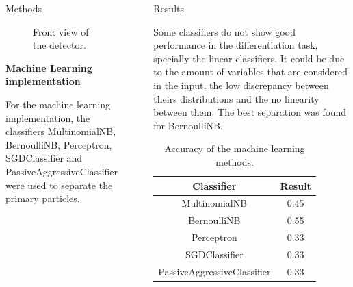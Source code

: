 \documentclass{beamer}
\newlength{\sepwidthB}
\newlength{\colwidthB}
\newcommand{\separatorcolumnB}{\begin{column}{\sepwidthB}\end{column}}
\begin{document}
\begin{frame}{}
\begin{columns}
\begin{column}[T]{\colwidthB}
\begin{block}{Methods}
\begin{figure}[htb]
            \caption{Front view of the detector.}\label{fig:cropped-geometry}

          \end{figure}

          \textbf{Machine Learning implementation}

          For the machine learning implementation, the classifiers
          MultinomialNB, BernoulliNB, Perceptron, SGDClassifier and
          PassiveAggressiveClassifier were used to separate the primary
          particles.

        \end{block}

      \end{column}
      \separatorcolumnB

      \begin{column}[T]{\colwidthB}

        \begin{block}{Results}

          Some classifiers do not show good performance in the differentiation
          task, specially the linear classifiers. It could be due to the amount
          of variables that are considered in the input, the low discrepancy
          between theirs distributions and the no linearity between them. The
          best separation was found for BernoulliNB.

          \begin{table}[hbt]
            \centering
            \begin{tabular}{c c}
              \textbf{Classifier} & \textbf{Result}\\
              \toprule
              MultinomialNB & 0.45\\
              \midrule
              BernoulliNB & 0.55\\
              \midrule
              Perceptron & 0.33\\
              \midrule
              SGDClassifier & 0.33\\
              \midrule
              PassiveAggressiveClassifier & 0.33\\
              \bottomrule
            \end{tabular}
            \caption{Accuracy of the machine learning methods.}\label{tb:machine-learning-results}
          \end{table}

        \end{block}


\end{column}
\end{columns}
\end{frame}
\end{document}
